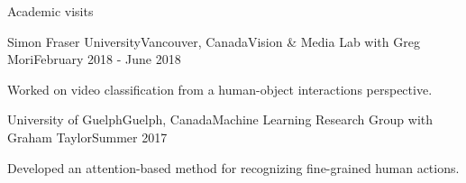 \documentclass{resume} %
\begin{document}
\begin{rSection}{Academic visits}
     \begin{rSubsection}{Simon Fraser University}{Vancouver, Canada}{Vision \& Media Lab with Greg Mori}{February 2018 - June 2018}
            \item Worked on video classification from a human-object interactions perspective.
    \end{rSubsection}
     \begin{rSubsection}{University of Guelph}{Guelph, Canada}{Machine Learning Research Group with Graham Taylor}{Summer 2017}
            \item Developed an attention-based method for recognizing fine-grained human actions.
    \end{rSubsection}
\end{rSection}

\end{document}

